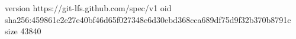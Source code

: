 version https://git-lfs.github.com/spec/v1
oid sha256:459861c2e27e40bf46d65f027348e6d30ebd368cca689df75d9f32b370b8791c
size 43840

